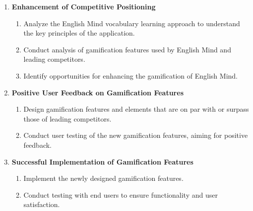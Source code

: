 \begin{enumerate}
    \item \textbf{Enhancement of Competitive Positioning}
    \begin{enumerate}
        \item Analyze the English Mind vocabulary learning approach to understand the key principles of the application.
        \item Conduct analysis of gamification features used by English Mind and leading competitors.
        \item Identify opportunities for enhancing the gamification of English Mind.
    \end{enumerate}

    \item \textbf{Positive User Feedback on Gamification Features}
    \begin{enumerate}
        \item Design gamification features and elements that are on par with or surpass those of leading competitors.
        \item Conduct user testing of the new gamification features, aiming for positive feedback.
    \end{enumerate}

    \item \textbf{Successful Implementation of Gamification Features}
    \begin{enumerate}
        \item Implement the newly designed gamification features.
        \item Conduct testing with end users to ensure functionality and user satisfaction.
    \end{enumerate}
\end{enumerate}
